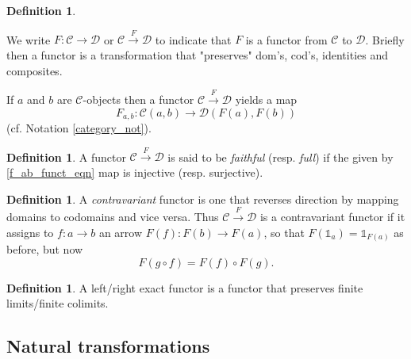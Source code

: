 \documentclass[10]{article}
\theoremstyle{plain}
\theoremstyle{definition}
\newtheorem{defn}[prop]{Definition}%
\theoremstyle{definition}
\newtheorem{definition}[prop]{Definition}
\numberwithin{equation}{section}
\newcommand{\7}{\dagger}                     %
\newcommand{\8}{\bullet}                     %
\renewcommand{\.}{\cdot}                     %
\renewcommand{\:}{\colon}                    %
\renewcommand{\:}{\colon}           %
\def\ee_#1{e_{{\scriptscriptstyle#1}}}       %
\newcommand{\be}{\begin{equation}}
\renewcommand{\ee}{\end{equation}}
\begin{document}
\begin{appendices}
\begin{definition}
\begin{enumerate}
					
				\end{enumerate}
				We write $F:\mathscr{C}\to \mathscr{D}$ or  $\mathscr{C}\xrightarrow{F} \mathscr{D}$ to indicate that $F$ is a 
				functor from $
				\mathscr{C}$ to $\mathscr{D}$. Briefly then a functor is a transformation that 
				"preserves" dom's, cod's, identities and composites. 
			\end{definition}
			If $a$ and $b$ are  $\mathscr{C}$-objects then a functor $\mathscr{C}\xrightarrow{F} \mathscr{D}$ yields a map
			\be\label{f_ab_funct_eqn}
			F_{a,b}:\mathscr{C}\left(a, b \right)  \to \mathscr{D}\left( F\left(a\right), F\left(b\right)\right)  
			\ee
			(cf. Notation \ref{category_not}).
			\begin{definition}\label{funct_full_faithfull_defn}\cite{bass}
				A functor $\mathscr{C}\xrightarrow{F} \mathscr{D}$ is said to be \textit{faithful} (resp. \textit{full}) if the given by \eqref{f_ab_funct_eqn} map is injective (resp. surjective).
			\end{definition}
			\begin{defn}\label{functor_contravariant_defn}\cite{goldblatt:topoi}
				A \textit{contravariant} functor is one that reverses direction by mapping domains 
				to codomains and vice versa. 
				Thus $\mathscr{C}\xrightarrow{F} \mathscr{D}$ is a contravariant functor if it assigns to $f: a\to b$ an 
				arrow $F(f):F(b)\to F(a)$, so that $F\left(\mathbb{1}_a\right)= \mathbb{1}_{F(a)}$ as before, but now 
				$$
				F\left( g\circ f\right) = F\left( f\right)\circ  F\left( g\right). 
				$$
			\end{defn}
			
			
			\begin{definition}\label{exact_functor_defn}\cite{goldblatt:topoi}
				A left/right exact functor is a functor that preserves finite limits/finite colimits.
			\end{definition}
			\subsection{Natural transformations}\label{natural_transformation_sec}

\end{appendices}
\end{document}
